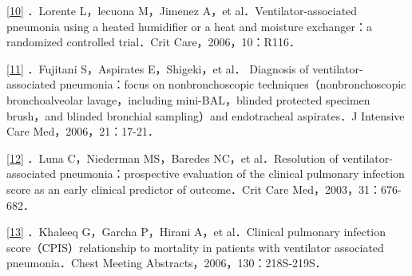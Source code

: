 \protect\hyperlink{text00014.htmlux5cux23ch10-13-back}{{[}10{]}}
．Lorente L，lecuona M，Jimenez A，et al．Ventilator-associated
pneumonia using a heated humidifier or a heat and moisture exchanger：a
randomized controlled trial．Crit Care，2006，10：R116．

\protect\hyperlink{text00014.htmlux5cux23ch11-13-back}{{[}11{]}}
．Fujitani S，Aspirates E，Shigeki，et al． Diagnosis of
ventilator-associated pneumonia：focus on nonbronchoscopic
techniques（nonbronchoscopic bronchoalveolar lavage，including
mini-BAL，blinded protected specimen brush，and blinded bronchial
sampling）and endotracheal aspirates．J Intensive Care
Med，2006，21：17-21．

\protect\hyperlink{text00014.htmlux5cux23ch12-13-back}{{[}12{]}} ．Luna
C，Niederman MS，Baredes NC，et al．Resolution of ventilator-associated
pneumonia：prospective evaluation of the clinical pulmonary infection
score as an early clinical predictor of outcome．Crit Care
Med，2003，31：676-682．

\protect\hyperlink{text00014.htmlux5cux23ch13-13-back}{{[}13{]}}
．Khaleeq G，Garcha P，Hirani A，et al．Clinical pulmonary infection
score（CPIS）relationship to mortality in patients with ventilator
associated pneumonia．Chest Meeting Abstracts，2006，130：218S-219S．

\protect\hypertarget{text00015.html}{}{}

